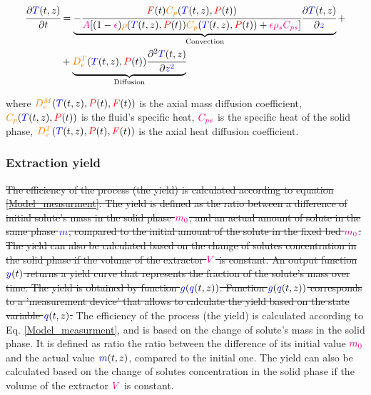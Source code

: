 \documentclass[../Parameter_fitting.tex]{subfiles}
\begin{document}
			{\footnotesize
				\begin{equation} \label{Model_heat}
					\begin{split}
						\cfrac{\partial {\color{blue}T}(t,z)}{\partial t} &= 
						\underbrace{ -\cfrac{{\color{red}F}(t) {\color{orange}C_p}({\color{blue}T}(t,z),{\color{red}P}(t))}{{\color{magenta}A} 	[(1-{\color{magenta}\epsilon}){\color{orange}\rho}({\color{blue}T}(t,z),{\color{red}P}(t)) {\color{orange}C_p} ({\color{blue}T}(t,z),{\color{red}P}(t)) + {\color{magenta} \epsilon \rho_s C_{ps} } ]} \cfrac{\partial {\color{blue}T}(t,z)}{\partial {\color{blue}z}}  }_{\text{Convection}} + \\
						& + \underbrace{ {\color{orange}D^T_e}({\color{blue}T}(t,z),{\color{red}P}(t)) \cfrac{\partial^2 {\color{blue}T}(t,z)}{\partial {\color{blue}z^2}} }_{\text{Diffusion}}
					\end{split}
			\end{equation} }
			
			where $ {\color{orange}D^M_e}({\color{blue}T}(t,z),{\color{red}P}(t),{\color{red}F}(t))$ is the axial mass diffusion coefficient, ${\color{orange}C_p}({\color{blue}T}(t,z),{\color{red}P}(t))$ is the fluid's specific heat, ${\color{magenta}C_{ps}}$ is the specific heat of the solid phase, ${\color{orange}D^T_e}({\color{blue}T}(t,z),{\color{red}P}(t),{\color{red}F}(t))$ is the axial heat diffusion coefficient.
			
			\subsubsection{Extraction yield} \label{CH: Yield}
			\sout{The efficiency of the process (the yield) is calculated according to equation \ref{Model_measurment}. The yield is defined as the ratio between a difference of initial solute's mass in the solid phase ${\color{magenta}m_0}$, and an actual amount of solute in the same phase ${\color{blue}m}$, compared to the initial amount of the solute in the fixed bed ${\color{magenta}m_0}$. The yield can also be calculated based on the change of solutes concentration in the solid phase if the volume of the extractor ${\color{magenta}V}$ is constant.
				An output function ${\color{blue}y}(t)$ returns a yield curve that represents the fraction of the solute's mass over time. The yield is obtained by function ${\color{blue}g}({\color{blue}q}(t,z))$. Function ${\color{blue}g}({\color{blue}q}(t,z))$ corresponds to a 'measurement device' that allows to calculate the yield based on the state variable ${\color{blue}q}(t,z)$. }
			{\color{blue}The efficiency of the process (the yield) is calculated according to Eq. \ref{Model_measurment}, and is based on the change of solute's mass in the solid phase. It is defined as ratio the ratio between the difference of its initial value ${\color{magenta}m_0}$ and the actual value ${\color{blue}m}(t,z)$, compared to the initial one. The yield can also be calculated based on the change of solutes concentration in the solid phase if the volume of the extractor ${\color{magenta}V}$ is constant.}
			
\end{document}
